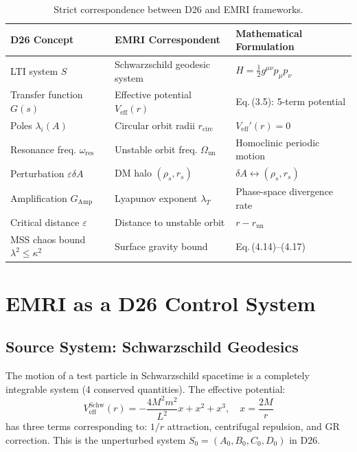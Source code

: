 \documentclass[12pt]{article}
\begin{document}
\begin{table}[H]
\centering
\begin{tabular}{l l l}
\toprule
\textbf{D26 Concept} & \textbf{EMRI Correspondent} & \textbf{Mathematical Formulation} \\
\midrule
LTI system $S$ & Schwarzschild geodesic system & $H = \frac{1}{2}g^{\mu\nu}p_\mu p_\nu$ \\
Transfer function $G(s)$ & Effective potential $V_{\text{eff}}(r)$ & Eq.\,(3.5): 5-term potential \\
Poles $\lambda_i(A)$ & Circular orbit radii $r_{\text{circ}}$ & $V_{\text{eff}}'(r) = 0$ \\
Resonance freq. $\omega_{\text{res}}$ & Unstable orbit freq. $\Omega_{\text{un}}$ & Homoclinic periodic motion \\
Perturbation $\varepsilon\delta A$ & DM halo $(\rho_s, r_s)$ & $\delta A \leftrightarrow (\rho_s, r_s)$ \\
Amplification $G_{\text{Amp}}$ & Lyapunov exponent $\lambda_T$ & Phase-space divergence rate \\
Critical distance $\varepsilon$ & Distance to unstable orbit & $r - r_{\text{un}}$ \\
MSS chaos bound $\lambda^2 \leq \kappa^2$ & Surface gravity bound & Eq.\,(4.14)--(4.17) \\
\bottomrule
\end{tabular}
\caption{Strict correspondence between D26 and EMRI frameworks.}
\label{tab:mapping}
\end{table}

\section{EMRI as a D26 Control System}

\subsection{Source System: Schwarzschild Geodesics}

The motion of a test particle in Schwarzschild spacetime is a completely integrable system (4 conserved quantities). The effective potential:
\begin{equation}
V_{\text{eff}}^{\text{Schw}}(r) = -\frac{4M^2m^2}{L^2}x + x^2 + x^3, \quad x = \frac{2M}{r}
\end{equation}
has three terms corresponding to: $1/r$ attraction, centrifugal repulsion, and GR correction. This is the unperturbed system $S_0 = (A_0, B_0, C_0, D_0)$ in D26.
\end{document}
